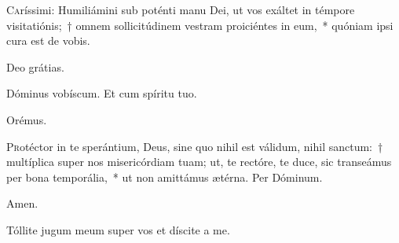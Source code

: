 
 








\lettrine{C}{a}ríssimi: Humiliámini sub poténti manu Dei, ut vos exáltet in témpore visitatiónis;~† omnem sollicitúdinem vestram proiciéntes in eum,~* quóniam ipsi cura est de vobis.

\rr Deo grátias.

\hymnus
   

  \admagnificat
  




  \vv Dóminus vobíscum. \rr Et cum spíritu tuo.
  
  \oratio
  
  Orémus.
  
\lettrine{P}{r}otéctor in te sperántium, Deus, sine quo nihil est válidum, nihil sanctum:~† multíplica super nos misericórdiam tuam; ut, te rectóre, te duce, sic transeámus per bona temporália,~* ut non amittámus ætérna. Per Dóminum.

\rr Amen.


\vv Tóllite jugum meum super vos et díscite a me.

